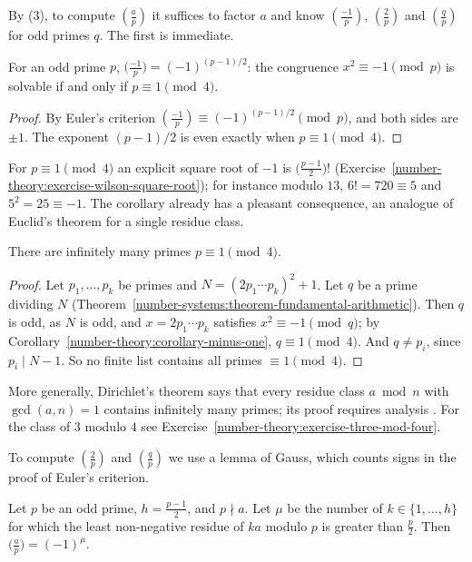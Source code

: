 By (3), to compute $(\frac{a}{p})$ it suffices to factor $a$ and know $(\frac{-1}{p})$, $(\frac{2}{p})$ and $(\frac{q}{p})$ for odd primes $q$. The first is immediate.

\begin{corollary}\label{number-theory:corollary-minus-one}
For an odd prime $p$, $\bigl(\frac{-1}{p}\bigr) = (-1)^{(p-1)/2}$: the congruence $x^2 \equiv -1 \pmod p$ is solvable if and only if $p \equiv 1 \pmod 4$.
\end{corollary}

\begin{proof}
By Euler's criterion $(\frac{-1}{p}) \equiv (-1)^{(p-1)/2} \pmod p$, and both sides are $\pm1$. The exponent $(p - 1)/2$ is even exactly when $p \equiv 1 \pmod 4$.
\end{proof}

For $p \equiv 1 \pmod 4$ an explicit square root of $-1$ is $\bigl(\frac{p-1}{2}\bigr)!$ (Exercise~\ref{number-theory:exercise-wilson-square-root}); for instance modulo $13$, $6! = 720 \equiv 5$ and
$5^2 = 25 \equiv -1$. The corollary already has a pleasant consequence, an analogue of Euclid's theorem for a single residue class.

\begin{proposition}\label{number-theory:proposition-primes-one-mod-four}
There are infinitely many primes $p \equiv 1 \pmod 4$.
\end{proposition}

\begin{proof}
Let $p_1, \ldots, p_k$ be primes and $N = (2p_1 \cdots p_k)^2 + 1$. Let $q$ be a prime dividing $N$ (Theorem~\ref{number-systems:theorem-fundamental-arithmetic}). Then $q$ is odd, as $N$ is odd, and
$x = 2p_1 \cdots p_k$ satisfies $x^2 \equiv -1 \pmod q$; by Corollary~\ref{number-theory:corollary-minus-one}, $q \equiv 1 \pmod 4$. And $q \neq p_i$, since $p_i \mid N - 1$. So no finite list contains all
primes $\equiv 1 \pmod 4$.
\end{proof}

More generally, Dirichlet's theorem says that every residue class $a \bmod n$ with $\gcd(a, n) = 1$ contains infinitely many primes; its proof requires analysis \cite{serre-arithmetic}. For the class of $3$ modulo $4$ see
Exercise~\ref{number-theory:exercise-three-mod-four}.

To compute $(\frac{2}{p})$ and $(\frac{q}{p})$ we use a lemma of Gauss, which counts signs in the proof of Euler's criterion.

\begin{lemma}\label{number-theory:lemma-gauss}
Let $p$ be an odd prime, $h = \frac{p-1}{2}$, and $p \nmid a$. Let $\mu$ be the number of $k \in \{1, \ldots, h\}$ for which the least non-negative residue of $ka$ modulo $p$ is greater than $\frac{p}{2}$.
Then $\bigl(\frac{a}{p}\bigr) = (-1)^\mu$.
\end{lemma}

